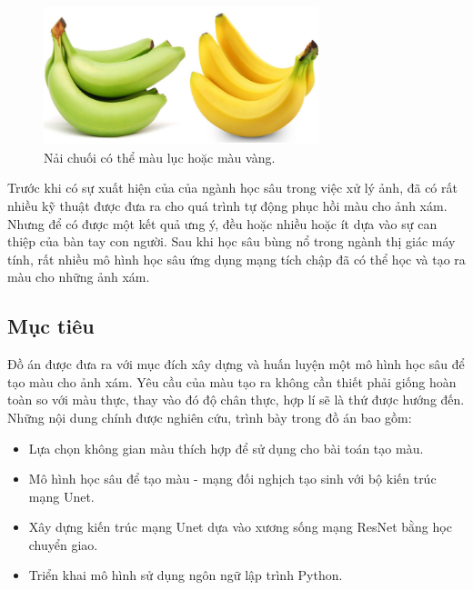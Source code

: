 \documentclass[a4paper, 12pt]{article}
\begin{document}

\begin{figure}
\includegraphics[width=8cm]{images/1_1.jpg} 
\caption{Nải chuối có thể màu lục hoặc màu vàng.}
\end{figure}

\noindent
Trước khi có sự xuất hiện của của ngành học sâu trong việc xử lý ảnh, đã có rất nhiều kỹ thuật được đưa ra cho quá trình tự động phục hồi màu cho ảnh xám. Nhưng để có được một kết quả ưng ý, đều hoặc nhiều hoặc ít dựa vào sự can thiệp của bàn tay con người. Sau khi học sâu bùng nổ trong ngành thị giác máy tính, rất nhiều mô hình học sâu ứng dụng mạng tích chập đã có thể học và tạo ra màu cho những ảnh xám.

\subsection{Mục tiêu}\label{objective}
Đồ án được đưa ra với mục đích xây dựng và huấn luyện một mô hình học sâu để tạo màu cho ảnh xám. Yêu cầu của màu tạo ra không cần thiết phải giống hoàn toàn so với màu thực, thay vào đó độ chân thực, hợp lí sẽ là thứ được hướng đến.\vspace{5pt}\\
Những nội dung chính được nghiên cứu, trình bày trong đồ án bao gồm:
\begin{itemize}
    \item Lựa chọn không gian màu thích hợp để sử dụng cho bài toán tạo màu.
    \item Mô hình học sâu để tạo màu - mạng đối nghịch tạo sinh với bộ kiến trúc mạng Unet.
    \item Xây dựng kiến trúc mạng Unet dựa vào xương sống mạng ResNet bằng học chuyển giao.
    \item Triển khai mô hình sử dụng ngôn ngữ lập trình Python.
\end{itemize}
\end{document}
